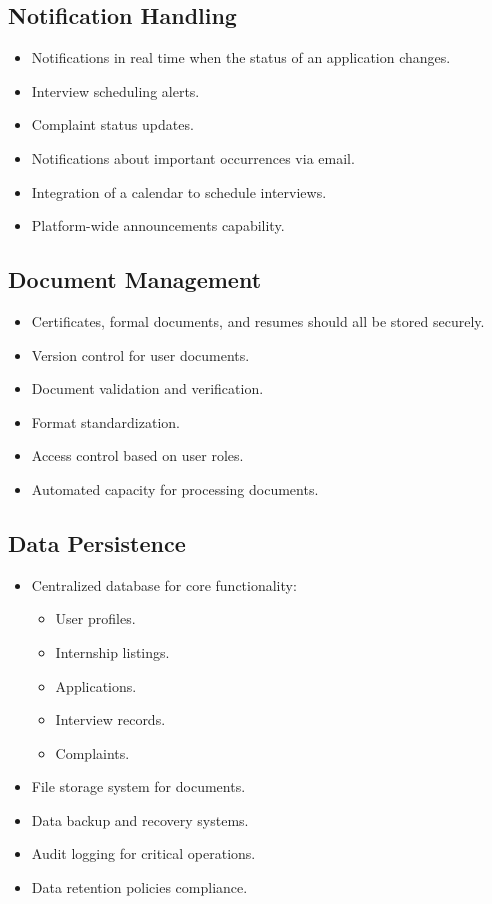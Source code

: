 \subsection{Notification Handling}
\label{subsec:notification_handling}
\begin{itemize}
    \item Notifications in real time when the status of an application changes.
    \item Interview scheduling alerts.
    \item Complaint status updates.
    \item Notifications about important occurrences via email.
    \item Integration of a calendar to schedule interviews.
    \item Platform-wide announcements capability.
\end{itemize}

\subsection{Document Management}
\label{subsec:document_management}
\begin{itemize}
    \item Certificates, formal documents, and resumes should all be stored securely.
    \item Version control for user documents.
    \item Document validation and verification.
    \item Format standardization.
    \item Access control based on user roles.
    \item Automated capacity for processing documents.
\end{itemize}

\subsection{Data Persistence}
\label{subsec:data_persistence}
\begin{itemize}
    \item Centralized database for core functionality:
    \begin{itemize}
        \item User profiles.
        \item Internship listings.
        \item Applications.
        \item Interview records.
        \item Complaints.
    \end{itemize}
    \item File storage system for documents.
    \item Data backup and recovery systems.
    \item Audit logging for critical operations.
    \item Data retention policies compliance.
\end{itemize}

